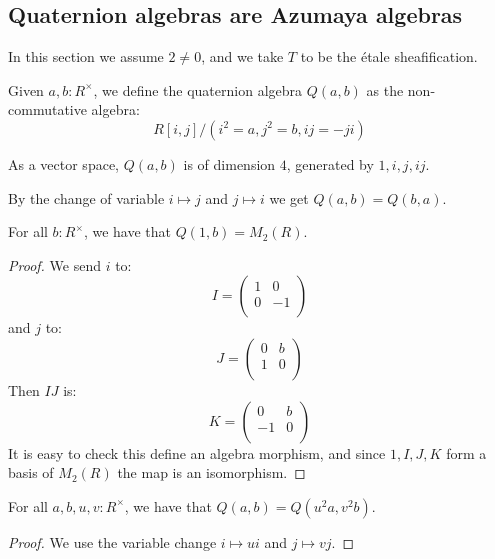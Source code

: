 \subsection{Quaternion algebras are Azumaya algebras}

In this section we assume $2\not=0$, and we take $T$ to be the étale sheafification.

\begin{definition}
Given $a,b:R^\times$, we define the quaternion algebra $Q(a,b)$ as the non-commutative algebra:
\[R[i,j]/(i^2=a,j^2=b,ij=-ji)\] 
\end{definition}

\begin{remark}
As a vector space, $Q(a,b)$ is of dimension $4$, generated by $1,i,j,ij$.
\end{remark}

\begin{remark}
By the change of variable $i\mapsto j$ and $j\mapsto i$ we get $Q(a,b) = Q(b,a)$.
\end{remark}

\begin{lemma}\label{quaternion-split}
For all $b:R^\times$, we have that $Q(1,b) = M_2(R)$.
\end{lemma}

\begin{proof}
We send $i$ to:
\[I = \begin{pmatrix}
1 & 0\\
0 & -1\\
\end{pmatrix}\]
and $j$ to:
\[J = \begin{pmatrix}
0 & b\\
1 & 0\\
\end{pmatrix}\]
Then $IJ$ is:
\[K = \begin{pmatrix}
0 & b\\
-1 & 0\\
\end{pmatrix}\]
It is easy to check this define an algebra morphism, and since $1,I,J,K$ form a basis of $M_2(R)$ the map is an isomorphism.
\end{proof}

\begin{lemma}\label{quaternion-change-variable}
For all $a,b,u,v:R^\times$, we have that $Q(a,b) = Q(u^2a,v^2b)$.
\end{lemma}

\begin{proof}
We use the variable change $i\mapsto ui$ and $j\mapsto vj$.
\end{proof}

